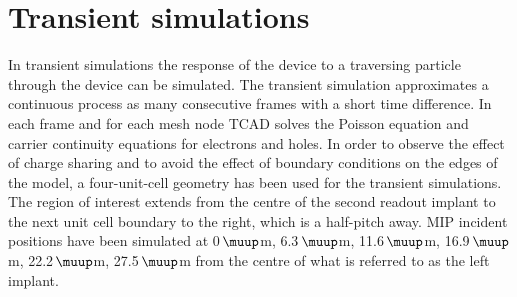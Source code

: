 \documentclass[a4paper,11pt]{article}
\begin{document}
\section{Transient simulations}
\label{sec:tr}
In transient simulations the response of the device to a traversing particle through the device can be simulated. 
The transient simulation approximates a continuous process as many consecutive frames with a short time difference. 
In each frame and for each mesh node TCAD solves the Poisson equation and carrier continuity equations for electrons and holes.
In order to observe the effect of charge sharing and to avoid the effect of boundary conditions on the edges of the model, a four-unit-cell geometry has been used for the transient simulations. 
The region of interest extends from the centre of the second readout implant to the next unit cell boundary to the right, which is a half-pitch away.  
MIP incident positions have been simulated at 0\,$\muup$m, 6.3\,$\muup$m, 11.6\,$\muup$m, 16.9\,$\muup$m, 22.2\,$\muup$m, 27.5\,$\muup$m from the centre of what is referred to as the left implant.
\end{document}
